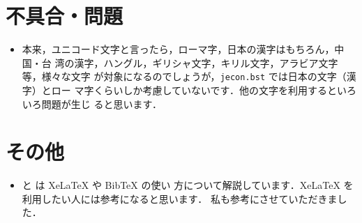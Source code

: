 \documentclass[article]{jlreq}
\begin{document}


\section{不具合・問題}

\begin{itemize}
 \item 本来，ユニコード文字と言ったら，ローマ字，日本の漢字はもちろん，中国・台
       湾の漢字，ハングル，ギリシャ文字，キリル文字，アラビア文字等，様々な文字
       が対象になるのでしょうが，\texttt{jecon.bst} では日本の文字（漢字）とロー
       マ字くらいしか考慮していないです．他の文字を利用するといろいろ問題が生じ
       ると思います．
\end{itemize}


\section{その他}

\begin{itemize}
 \item \citet{120005614155} と \citet{120005678435} は XeLaTeX や BibTeX の使い
       方について解説しています．XeLaTeX を利用したい人には参考になると思います．
       私も参考にさせていただきました．
\end{itemize}

\vspace*{2em}

\nocite{*}



%

\end{document}
